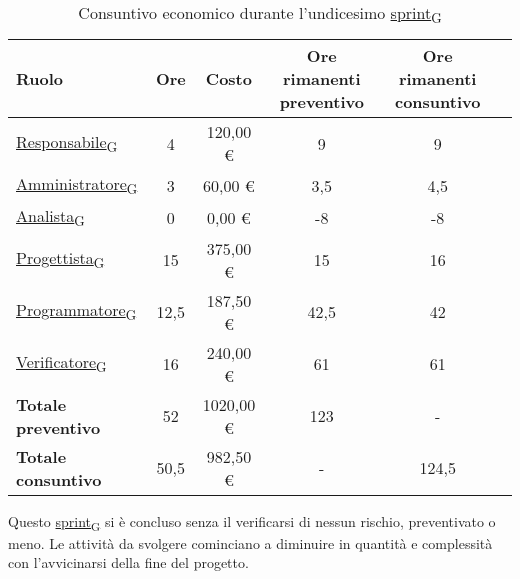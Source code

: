 \begin{table}[!h]
    \centering
    \begin{tabular}{ | l | c | c | c | c | c | }
        \hline
        \textbf{Ruolo} & \textbf{Ore} & \textbf{Costo} & \textbf{Ore rimanenti preventivo} & \textbf{Ore rimanenti consuntivo} \\
        \hline
        \href{https://7last.github.io/docs/pb/documentazione-interna/glossario\#responsabile}{Responsabile\textsubscript{G}}     &  4   &  120,00 € &   9   &   9   \\
        \href{https://7last.github.io/docs/pb/documentazione-interna/glossario\#amministratore}{Amministratore\textsubscript{G}} &  3   &   60,00 € &   3,5 &   4,5 \\
        \href{https://7last.github.io/docs/pb/documentazione-interna/glossario\#analista}{Analista\textsubscript{G}}             &  0   &    0,00 € &  -8   &  -8   \\
        \href{https://7last.github.io/docs/pb/documentazione-interna/glossario\#progettista}{Progettista\textsubscript{G}}       & 15   &  375,00 € &  15   &  16   \\
        \href{https://7last.github.io/docs/pb/documentazione-interna/glossario\#programmatore}{Programmatore\textsubscript{G}}   & 12,5 &  187,50 € &  42,5 &  42   \\
        \href{https://7last.github.io/docs/pb/documentazione-interna/glossario\#verificatore}{Verificatore\textsubscript{G}}     & 16   &  240,00 € &  61   &  61   \\
        \hline
        \textbf{Totale preventivo} & 52   & 1020,00 € & 123   &   -   \\
        \hline
        \textbf{Totale consuntivo} & 50,5 &  982,50 € &   -   & 124,5 \\
        \hline
    \end{tabular}
    \caption{Consuntivo economico durante l'undicesimo \href{https://7last.github.io/docs/pb/documentazione-interna/glossario\#sprint}{sprint\textsubscript{G}}}
\end{table}

Questo \href{https://7last.github.io/docs/pb/documentazione-interna/glossario\#sprint}{sprint\textsubscript{G}} si è concluso senza il verificarsi di nessun rischio, preventivato o meno. Le attività da svolgere cominciano a diminuire in quantità e complessità con l'avvicinarsi della fine del progetto. 


